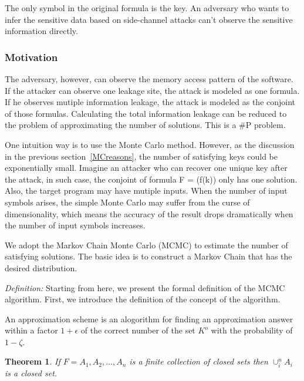 The only symbol in the original formula is the key. 
An adversary who wants to infer the sensitive data based on side-channel 
attacks can't observe the sensitive information directly. 

\subsubsection{Motivation}
The adversary, however, can observe the memory access pattern of the software. 
If the attacker can observe one leakage site, the attack is modeled as one formula. 
If he observes mutiple information leakage, the attack is modeled as the conjoint 
of those formulas. Calculating the total information leakage can be reduced to the
problem of approximating the number of solutions. This is a \#P problem.

One intuition way is to use the Monte Carlo method. However, 
as the discussion in the previous section~\ref{MCreasons},
the number of satisfying keys could be exponentially small. Imagine an attacker 
who can recover one unique key after the attack, in such case, 
the conjoint of formula F = (f(k)) only has one solution.
Also, the target program may have mutiple inputs. When the number of input
symbols arises, the simple Monte Carlo may suffer from the curse of dimensionality,
which means the accuracy of the result drops dramatically when the
number of input symbols increases. 

We adopt the Markov Chain Monte Carlo (MCMC) to estimate the number of 
satisfying solutions. The basic idea is to construct a Markov Chain that
has the desired distribution.

\textit{Definition:}
Starting from here, we present the formal definition of the MCMC algorithm.
First, we introduce the definition of the concept of the algorithm.

\begin{mydef}
      An approximation scheme is an alogorithm for finding an approximation
      answer within a factor $1 + \epsilon$ of the correct number of the set
      $K^o$ with the probability of $1 - \zeta$.
\end{mydef}

\newtheorem{theorem}{Theorem}[section]

\begin{theorem}
      If $F={A_1,A_2,...,A_n}$ is a finite collection of closed sets then 
      $\cup_{i}^{n}A_i$ is a closed set.
\end{theorem}

